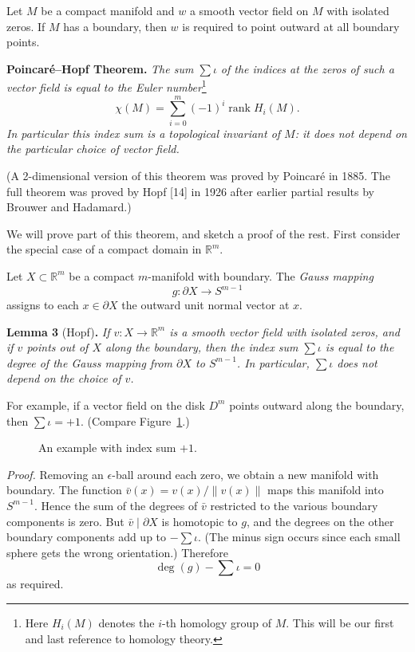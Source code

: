 Let $M$ be a compact manifold and $w$ a smooth vector field on $M$ with isolated zeros. If $M$ has a boundary, then $w$ is required to point outward at all boundary points.

\noindent\textbf{Poincar\'e--Hopf Theorem.} \textit{The sum $\sum \iota$ of the indices at the zeros of such a vector field is equal to the Euler number}\footnote{Here $H_i(M)$ denotes the $i$-th homology group of $M$. This will be our first and last reference to homology theory.}
\[
\chi(M) = \sum_{i=0}^m (-1)^i \operatorname{rank} H_i(M).
\]
\textit{In particular this index sum is a topological invariant of $M$: it does not depend on the particular choice of vector field.}

(A 2-dimensional version of this theorem was proved by Poincar\'e in 1885. The full theorem was proved by Hopf [14] in 1926 after earlier partial results by Brouwer and Hadamard.)

We will prove part of this theorem, and sketch a proof of the rest. First consider the special case of a compact domain in $\mathbb{R}^m$.

Let $X \subset \mathbb{R}^m$ be a compact $m$-manifold with boundary. The \emph{Gauss mapping}
\[
g : \partial X \to S^{m-1}
\]
assigns to each $x \in \partial X$ the outward unit normal vector at $x$.



\noindent\textbf{Lemma 3} (Hopf)\textbf{.} \textit{If $v : X \to \mathbb{R}^m$ is a smooth vector field with isolated zeros, and if $v$ points out of $X$ along the boundary, then the index sum $\sum \iota$ is equal to the degree of the Gauss mapping from $\partial X$ to $S^{m-1}$. In particular, $\sum \iota$ does not depend on the choice of $v$.}

For example, if a vector field on the disk $D^m$ points outward along the boundary, then $\sum \iota = +1$. (Compare Figure~\ref{fig:milnor-13}.)

\begin{figure}[htbp]
\centering
\setcounter{figure}{12}%
\caption{An example with index sum $+1$.}\label{fig:milnor-13}
\end{figure}

\noindent\textit{Proof.}
Removing an $\epsilon$-ball around each zero, we obtain a new manifold with boundary. The function $\bar{v}(x) = v(x)/\|v(x)\|$ maps this manifold into $S^{m-1}$. Hence the sum of the degrees of $\bar{v}$ restricted to the various boundary components is zero. But $\bar{v} \mid \partial X$ is homotopic to $g$, and the degrees on the other boundary components add up to $-\sum \iota$. (The minus sign occurs since each small sphere gets the wrong orientation.) Therefore
\[
\deg(g) - \sum \iota = 0
\]
as required.

